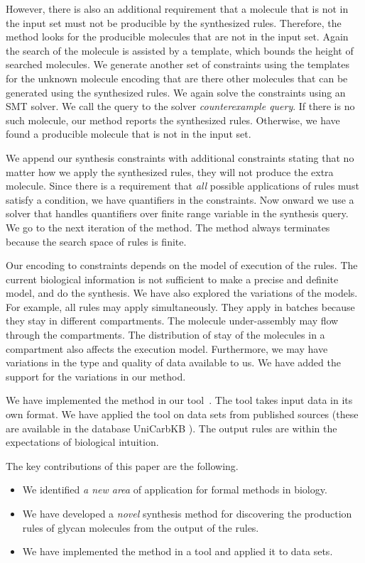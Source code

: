 However, there is also an additional requirement that a molecule
that is not in the input set must not be producible by the synthesized rules.
Therefore, the method looks for the producible molecules that are not in the input set.
Again the search of the molecule is assisted by a template, which bounds the height
of searched molecules.
We generate another set of constraints using the templates for the unknown molecule encoding that
are there other molecules that can be generated using the synthesized rules.
We again solve the constraints using an SMT solver.
We call the query to the solver {\em counterexample query}.
If there is no such molecule, our method reports
the synthesized rules.
Otherwise, we have found a producible molecule that is not in the input set.

We append our synthesis constraints with additional constraints stating that
no matter how we apply the synthesized rules, they will not produce the extra molecule.
Since there is a requirement that {\em all} possible applications of rules must satisfy
a condition, we have quantifiers in the constraints.
Now onward we use a solver that handles quantifiers over finite range variable in
the synthesis query.
We go to the next iteration of the method.
The method always terminates because the search space of rules is finite.

Our encoding to constraints depends on the model of execution of the rules.
The current biological information is not sufficient to make a precise
and definite model, and do the synthesis.
We have also explored the variations of the models. For example, all rules
may apply simultaneously. They apply in batches because they
stay in different compartments.
The molecule under-assembly may flow through the compartments.
The distribution of stay of the molecules in a compartment also affects
the execution model.
Furthermore, we may have variations in the type and quality of data available to us.
We have added the support for the variations in our method.

We have implemented the method in our tool~\ourtool. The tool takes input data in its own format.
We have applied the tool on data sets from published sources (these are available in the database UniCarbKB \cite{Campbell2013}).
The output rules are within the expectations of biological
intuition.

The key contributions of this paper are the following.
\begin{itemize}
\item We identified {\em a new area} of application for formal methods in biology.
\item We have developed a {\em novel} synthesis method for discovering the production rules of glycan molecules from the output of the rules.
\item We have implemented the method in a tool and applied it to data sets.
\end{itemize}


